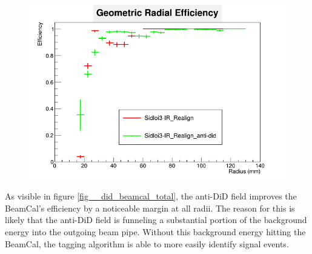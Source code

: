 \documentclass{report}
\begin{document}
                \begin{figure}[H]
                    \includegraphics[width=\textwidth]{RadialEfficiency_geometric_did}
                    \centering
                    \caption{}
                    \label{fig__did_beamcal_geom}
                \end{figure}

                As visible in figure \ref{fig__did_beamcal_total}, the anti-DiD field improves the BeamCal's efficiency by a noticeable margin at all radii. The reason for this is likely that the anti-DiD field is funneling a substantial portion of the background energy into the outgoing beam pipe. Without this background energy hitting the BeamCal, the tagging algorithm is able to more easily identify signal events.
\end{document}

